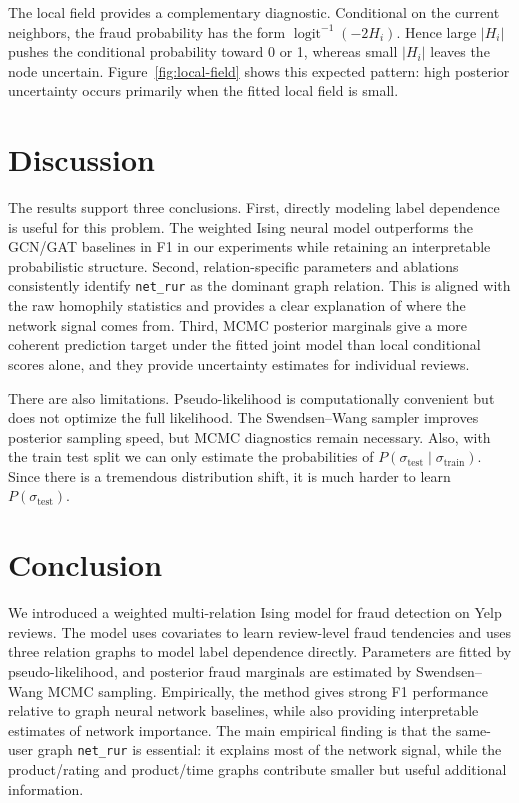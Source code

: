 \documentclass[twoside]{article}
\newcommand{\netrur}{\texttt{net\_rur}}
\begin{document}
The local field provides a complementary diagnostic. Conditional on the current neighbors, the fraud probability has the form $\operatorname{logit}^{-1}(-2H_i)$. Hence large $|H_i|$ pushes the conditional probability toward 0 or 1, whereas small $|H_i|$ leaves the node uncertain. Figure~\ref{fig:local-field} shows this expected pattern: high posterior uncertainty occurs primarily when the fitted local field is small.

\section{Discussion}

The results support three conclusions. First, directly modeling label dependence is useful for this problem. The weighted Ising neural model outperforms the GCN/GAT baselines in F1 in our experiments while retaining an interpretable probabilistic structure. Second, relation-specific parameters and ablations consistently identify \netrur{} as the dominant graph relation. This is aligned with the raw homophily statistics and provides a clear explanation of where the network signal comes from. Third, MCMC posterior marginals give a more coherent prediction target under the fitted joint model than local conditional scores alone, and they provide uncertainty estimates for individual reviews.

There are also limitations. Pseudo-likelihood is computationally convenient but does not optimize the full likelihood. The Swendsen--Wang sampler improves posterior sampling speed, but MCMC diagnostics remain necessary. Also, with the train test split we can only estimate the probabilities of $P(\sigma_{\text{test}}\mid \sigma_{\text{train}})$. Since there is a tremendous distribution shift, it is much harder to learn $P(\sigma_{\text{test}})$.

\section{Conclusion}

We introduced a weighted multi-relation Ising model for fraud detection on Yelp reviews. The model uses covariates to learn review-level fraud tendencies and uses three relation graphs to model label dependence directly. Parameters are fitted by pseudo-likelihood, and posterior fraud marginals are estimated by Swendsen--Wang MCMC sampling. Empirically, the method gives strong F1 performance relative to graph neural network baselines, while also providing interpretable estimates of network importance. The main empirical finding is that the same-user graph \netrur{} is essential: it explains most of the network signal, while the product/rating and product/time graphs contribute smaller but useful additional information.
\end{document}
